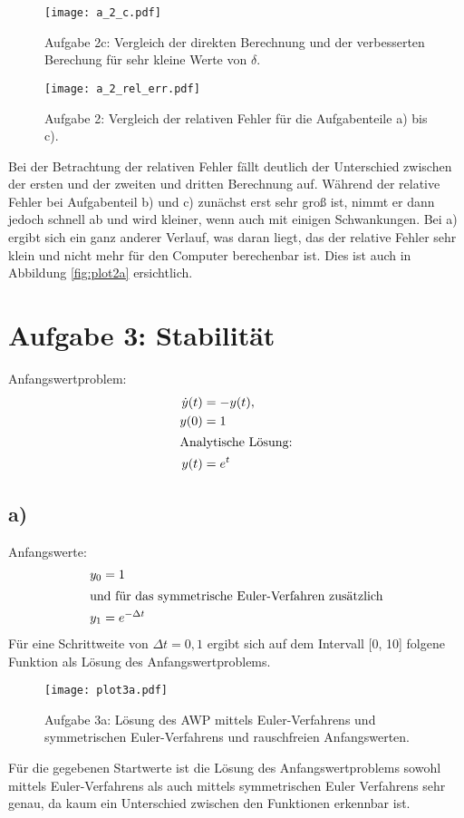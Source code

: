 \FloatBarrier
\begin{figure}[h]
    \centering
    \texttt{[image: a\_2\_c.pdf]}
    \caption{Aufgabe 2c: Vergleich der direkten Berechnung und der verbesserten Berechung für sehr kleine Werte von $\delta$.}
    \label{fig:plot2c}
\end{figure}
\FloatBarrier
\begin{figure}[h]
    \centering
    \texttt{[image: a\_2\_rel\_err.pdf]}
    \caption{Aufgabe 2: Vergleich der relativen Fehler für die Aufgabenteile a) bis c).}
    \label{fig:plot2_err}
\end{figure}
\FloatBarrier
\noindent
Bei der Betrachtung der relativen Fehler fällt deutlich der Unterschied zwischen der ersten und der zweiten
und dritten Berechnung auf. Während der relative Fehler bei Aufgabenteil b) und c) zunächst erst sehr groß ist,
nimmt er dann jedoch schnell ab und wird kleiner, wenn auch mit einigen Schwankungen. Bei a) ergibt sich ein ganz
anderer Verlauf, was daran liegt, das der relative Fehler sehr klein und nicht mehr für den Computer berechenbar ist. Dies ist auch in Abbildung \ref{fig:plot2a}
ersichtlich.

\section*{Aufgabe 3: Stabilität}
Anfangswertproblem:
\begin{align*}
  \dot{y}(t)&=-y(t), \\ y(0)&=1 \\
  \intertext{Analytische Lösung:} y(t)&=e^{t}
\end{align*}

\subsection*{a)}
Anfangswerte:
\begin{align*}
  y_0&=1\\
  \intertext{und für das symmetrische Euler-Verfahren zusätzlich}
  y_1&=e^{-\Delta t}
\end{align*}
Für eine Schrittweite von $\Delta t = 0,1$ ergibt sich auf dem Intervall [0, 10] folgene Funktion als Lösung des Anfangswertproblems.
\FloatBarrier
\begin{figure}[h]
    \centering
    \texttt{[image: plot3a.pdf]}
    \caption{Aufgabe 3a: Lösung des AWP mittels Euler-Verfahrens und symmetrischen Euler-Verfahrens und rauschfreien Anfangswerten.}
    \label{fig:plot3a}
\end{figure}
\FloatBarrier
Für die gegebenen Startwerte ist die Lösung des Anfangswertproblems sowohl mittels Euler-Verfahrens als auch mittels symmetrischen Euler Verfahrens sehr genau, da kaum ein Unterschied zwischen den Funktionen erkennbar ist.

